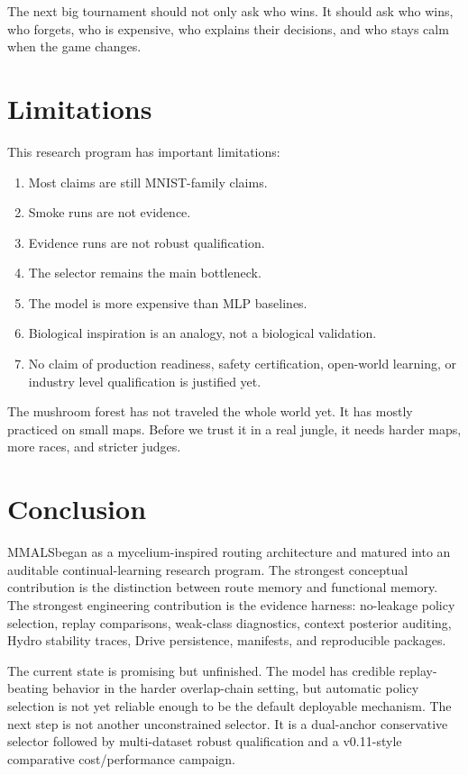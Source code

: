 \documentclass[11pt]{article}
\newcommand{\mmals}{\textsc{MMALS}}
\begin{document}
\begin{kidbox}
The next big tournament should not only ask who wins. It should ask who wins, who forgets, who is expensive, who explains their decisions, and who stays calm when the game changes.
\end{kidbox}

\section{Limitations}

This research program has important limitations:
\begin{enumerate}[leftmargin=*]
  \item Most claims are still MNIST-family claims.
  \item Smoke runs are not evidence.
  \item Evidence runs are not robust qualification.
  \item The selector remains the main bottleneck.
  \item The model is more expensive than MLP baselines.
  \item Biological inspiration is an analogy, not a biological validation.
  \item No claim of production readiness, safety certification, open-world learning, or industry level qualification is justified yet.
\end{enumerate}

\begin{kidbox}
The mushroom forest has not traveled the whole world yet. It has mostly practiced on small maps. Before we trust it in a real jungle, it needs harder maps, more races, and stricter judges.
\end{kidbox}

\section{Conclusion}

\mmals began as a mycelium-inspired routing architecture and matured into an auditable continual-learning research program. The strongest conceptual contribution is the distinction between route memory and functional memory. The strongest engineering contribution is the evidence harness: no-leakage policy selection, replay comparisons, weak-class diagnostics, context posterior auditing, Hydro stability traces, Drive persistence, manifests, and reproducible packages.

The current state is promising but unfinished. The model has credible replay-beating behavior in the harder overlap-chain setting, but automatic policy selection is not yet reliable enough to be the default deployable mechanism. The next step is not another unconstrained selector. It is a dual-anchor conservative selector followed by multi-dataset robust qualification and a v0.11-style comparative cost/performance campaign.
\end{document}
